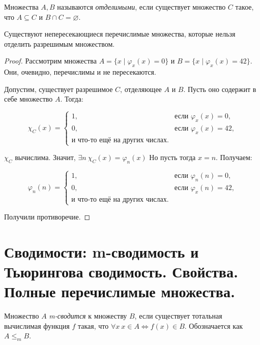 \documentclass{article}
\begin{document}
    \begin{definition}
        Множества $A, B$ называются \textit{отделимыми}, если существует множество $C$ такое, что $A
        \subseteq C$ и $B \cap C = \varnothing$.
    \end{definition}

    \begin{theorem}
        Существуют непересекающиеся перечислимые множества, которые нельзя отделить разрешимым
        множеством.
    \end{theorem}
    \begin{proof}
        Рассмотрим множества $A = \{x \mid \varphi_x(x) = 0\}$ и $B = \{x \mid \varphi_x(x) = 42\}$.
        Они, очевидно, перечислимы и не пересекаются.

        Допустим, существует разрешимое $C$, отделяющее $A$ и $B$. Пусть оно содержит в себе
        множество $A$. Тогда:

        $$
            \chi_C(x) =
            \begin{cases}
                1, & \text{если $\varphi_x(x) = 0$,}\\
                0, & \text{если $\varphi_x(x) = 42$,}\\
                \text{и что-то ещё на других числах.}
            \end{cases}
        $$

        $\chi_C$ вычислима. Значит, $\exists n \ \chi_C(x) = \varphi_n(x)$ Но пусть тогда $x = n$.
        Получаем:

        $$
            \varphi_n(n) =
            \begin{cases}
                1, & \text{если $\varphi_n(n) = 0$,}\\
                0, & \text{если $\varphi_x(n) = 42$,}\\
                \text{и что-то ещё на других числах.}
            \end{cases}
        $$

        Получили противоречие.
    \end{proof}

    \section{Сводимости: m-сводимость и Тьюрингова сводимость. Свойства. Полные перечислимые множества.}

    \begin{definition}
        Множество $A$ \textit{m-сводится} к множеству $B$, если существует тотальная вычислимая
        функция $f$ такая, что $\forall x \ x \in A \iff f(x) \in B$. Обозначается как $A
        \leqslant_m B$.
    \end{definition}
\end{document}
